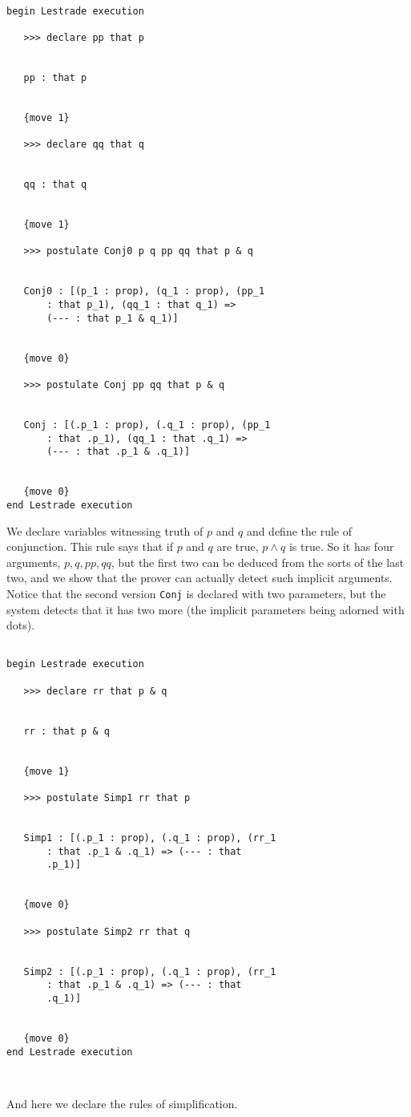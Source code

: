 \documentclass{slides}
\begin{document}
\begin{slide}
{\tiny
\begin{verbatim}

begin Lestrade execution

   >>> declare pp that p


   pp : that p


   {move 1}

   >>> declare qq that q


   qq : that q


   {move 1}

   >>> postulate Conj0 p q pp qq that p & q


   Conj0 : [(p_1 : prop), (q_1 : prop), (pp_1 
       : that p_1), (qq_1 : that q_1) => 
       (--- : that p_1 & q_1)]


   {move 0}

   >>> postulate Conj pp qq that p & q


   Conj : [(.p_1 : prop), (.q_1 : prop), (pp_1 
       : that .p_1), (qq_1 : that .q_1) => 
       (--- : that .p_1 & .q_1)]


   {move 0}
end Lestrade execution

\end{verbatim}
}
\end{slide}

We declare variables witnessing truth of $p$ and $q$ and define the rule of conjunction.  This rule says that if $p$ and $q$ are true, $p \wedge q$ is true.  So it has four arguments,
$p,q,pp,qq$, but the first two can be deduced from the sorts of the last two, and we show that the prover can actually detect such implicit arguments.  Notice that the second version 
{\tt Conj} is declared with two parameters, but the system detects that it has two more (the implicit parameters being adorned with dots).

\begin{slide}

{\tiny 

\begin{verbatim}

begin Lestrade execution

   >>> declare rr that p & q


   rr : that p & q


   {move 1}

   >>> postulate Simp1 rr that p


   Simp1 : [(.p_1 : prop), (.q_1 : prop), (rr_1 
       : that .p_1 & .q_1) => (--- : that 
       .p_1)]


   {move 0}

   >>> postulate Simp2 rr that q


   Simp2 : [(.p_1 : prop), (.q_1 : prop), (rr_1 
       : that .p_1 & .q_1) => (--- : that 
       .q_1)]


   {move 0}
end Lestrade execution



\end{verbatim}

}

And here we declare the rules of simplification.

\end{slide}
\end{document}
